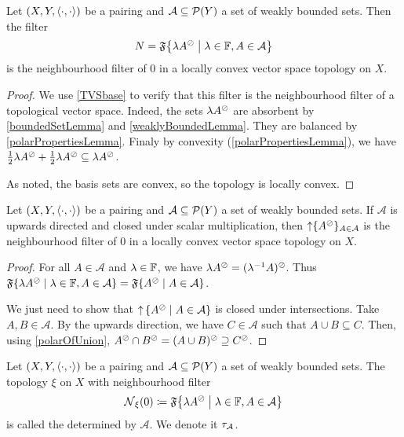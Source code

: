 \begin{proposition}
Let $\left( X,Y,\left\langle \cdot,\cdot \right\rangle \right)$ be a pairing and $\mathcal{A}\subseteq\operatorname{\mathcal{P}}(Y)$ a set of weakly bounded sets. Then the filter
\[ N = \mathfrak{F}\setbuilder{\lambda A^\pol}{\lambda\in \F, A\in \mathcal{A}} \]
is the neighbourhood filter of $0$ in a locally convex vector space topology on $X$.
\end{proposition}
\begin{proof}
We use \ref{TVSbase} to verify that this filter is the neighbourhood filter of a topological vector space. Indeed, the sets $\lambda A^\oslash$ are absorbent by \ref{boundedSetLemma} and \ref{weaklyBoundedLemma}. They are balanced by \ref{polarPropertiesLemma}. Finaly by convexity (\ref{polarPropertiesLemma}), we have $\frac{1}{2}\lambda A^\oslash + \frac{1}{2} \lambda A^\oslash \subseteq \lambda A^\oslash$.

As noted, the basis sets are convex, so the topology is locally convex.
\end{proof}
\begin{corollary}
Let $\left( X,Y,\left\langle \cdot,\cdot \right\rangle \right)$ be a pairing and $\mathcal{A}\subseteq\operatorname{\mathcal{P}}(Y)$ a set of weakly bounded sets.
If $\mathcal{A}$ is upwards directed and closed under scalar multiplication, then $\operatorname{\uparrow}\{A^\oslash\}_{A\in \mathcal{A}}$ is the neighbourhood filter of $0$ in a locally convex vector space topology on $X$.
\end{corollary}
\begin{proof}
For all $A\in \mathcal{A}$ and $\lambda\in \mathbb{F}$, we have $\lambda A^\oslash = (\lambda^{-1}A)^\oslash$. Thus $\mathfrak{F}\setbuilder{\lambda A^\pol}{\lambda\in \F, A\in \mathcal{A}} = \mathfrak{F}\setbuilder{A^\pol}{A\in \mathcal{A}}$.

We just need to show that $\upset\setbuilder{A^\pol}{A\in \mathcal{A}}$ is closed under intersections. Take $A,B\in \mathcal{A}$. By the upwards direction, we have $C\in \mathcal{A}$ such that $A\cup B \subseteq C$.
Then, using \ref{polarOfUnion}, $A^\oslash\cap B^\oslash = (A\cup B)^\oslash \supseteq C^\oslash$.
\end{proof}

\begin{definition}
Let $\left( X,Y,\left\langle \cdot,\cdot \right\rangle \right)$ be a pairing and $\mathcal{A}\subseteq\operatorname{\mathcal{P}}(Y)$ a set of weakly bounded sets. The topology $\xi$ on $X$ with neighbourhood filter
\[ \neighbourhood_\xi(0) \defeq \mathfrak{F}\setbuilder{\lambda A^\pol}{\lambda\in \F, A\in \mathcal{A}} \]
is called the  determined by $\mathcal{A}$. We denote it $\tau_{\mathcal{A}}$.
\end{definition}

